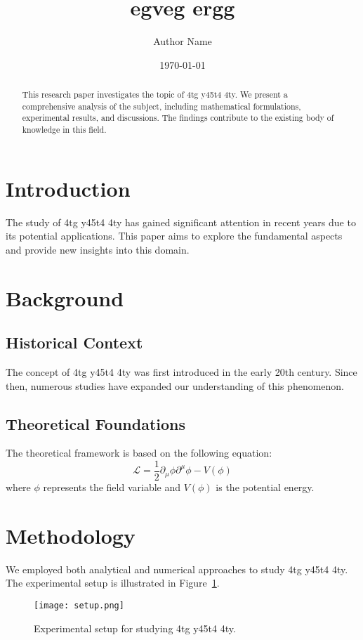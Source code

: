 \documentclass[12pt]{article}
\title{egveg ergg}
\author{Author Name}
\date{\today}
\begin{document}
\maketitle

\begin{abstract}
This research paper investigates the topic of 4tg y45t4 4ty. We present a comprehensive analysis of the subject, including mathematical formulations, experimental results, and discussions. The findings contribute to the existing body of knowledge in this field.
\end{abstract}

\section{Introduction}
The study of 4tg y45t4 4ty has gained significant attention in recent years due to its potential applications. This paper aims to explore the fundamental aspects and provide new insights into this domain.

\section{Background}
\subsection{Historical Context}
The concept of 4tg y45t4 4ty was first introduced in the early 20th century. Since then, numerous studies have expanded our understanding of this phenomenon.

\subsection{Theoretical Foundations}
The theoretical framework is based on the following equation:
\begin{equation}
    \mathcal{L} = \frac{1}{2} \partial_\mu \phi \partial^\mu \phi - V(\phi)
\end{equation}
where $\phi$ represents the field variable and $V(\phi)$ is the potential energy.

\section{Methodology}
We employed both analytical and numerical approaches to study 4tg y45t4 4ty. The experimental setup is illustrated in Figure~\ref{fig:setup}.

\begin{figure}[h]
    \centering
    \texttt{[image: setup.png]}
    \caption{Experimental setup for studying 4tg y45t4 4ty.}
    \label{fig:setup}
\end{figure}
\end{document}
